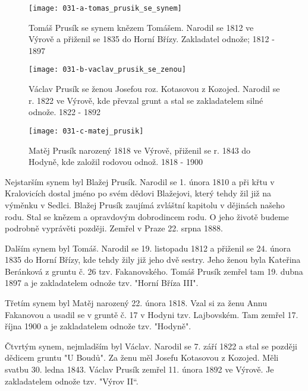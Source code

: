 \documentclass[../dejiny-rodu-prusiku.tex]{subfiles}
\begin{document}

\begin{figure}
\centering
\texttt{[image: 031-a-tomas\_prusik\_se\_synem]}
\caption{Tomáš Prusík se synem knězem Tomášem. Narodil se 1812 ve Výrově a přiženil se 1835 do Horní Břízy. Zakladatel odnože; 1812 - 1897}
\label{fig:031-a-tomas_prusik_se_synem}
\end{figure}

\begin{figure}
\centering
\texttt{[image: 031-b-vaclav\_prusik\_se\_zenou]}
\caption{Václav Prusík se ženou Josefou roz. Kotasovou z Kozojed. Narodil se r. 1822 ve Výrově, kde převzal grunt a stal se zakladatelem silné odnože. 1822 - 1892}
\label{fig:031-b-vaclav_prusik_se_zenou}
\end{figure}

\begin{figure}
\centering
\texttt{[image: 031-c-matej\_prusik]}
\caption{Matěj Prusík narozený 1818 ve Výrově, přiženil se r. 1843 do Hodyně, kde založil rodovou odnož. 1818 - 1900}
\label{fig:031-c-matej_prusik}
\end{figure}


Nejstarším synem byl Blažej Prusík. Narodil se 1. úno­ra 1810 a při křtu v Kralovicích dostal jméno po svém dědovi Blažejovi, který tehdy žil již na výměnku v Sedlci. Blažej Prusík zaujímá zvláštní kapitolu v dějinách našeho rodu. Stal se knězem a opravdovým dobrodincem rodu. O jeho životě budeme podrobně vyprávěti později. Zemřel v Praze 22. srpna 1888.

Dalším synem byl Tomáš. Narodil se 19. listopadu 1812 a přiženil se 24. února 1835 do Horní Břízy, kde tehdy žily již jeho dvě sestry. Jeho ženou byla Kateřina Beránková z gruntu č. 26 tzv. Fakanovského. Tomáš Prusík zemřel tam 19. dubna 1897 a je zakladatelem odnože tzv. "Horní Bříza III".

Třetím synem byl Matěj narozený 22. února 1818. Vzal si za ženu Annu Fakanovou a usadil se v gruntě č. 17 v Hodyni tzv. Lajbovském. Tam zemřel 17. října 1900 a je zakladatelem odnože tzv. "Hodyně".

Čtvrtým synem, nejmladším byl Václav. Narodil se 7. září 1822 a stal se později dědicem gruntu "U Boudů". Za ženu měl Josefu Kotasovou z Kozojed. Měli svatbu 30. led­na 1843. Václav Prusík zemřel 11. února 1892 ve Výrově. Je zakladatelem odnože tzv. "Výrov II“.
\end{document}
